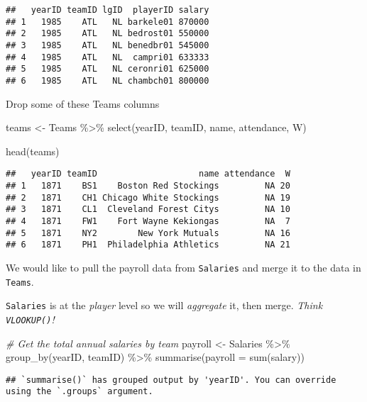 \documentclass[
]{article}
\newenvironment{Shaded}{\begin{snugshade}}{\end{snugshade}}
\newcommand{\AttributeTok}[1]{\textcolor[rgb]{0.77,0.63,0.00}{#1}}
\newcommand{\CommentTok}[1]{\textcolor[rgb]{0.56,0.35,0.01}{\textit{#1}}}
\newcommand{\FunctionTok}[1]{\textcolor[rgb]{0.00,0.00,0.00}{#1}}
\newcommand{\NormalTok}[1]{#1}
\newcommand{\OtherTok}[1]{\textcolor[rgb]{0.56,0.35,0.01}{#1}}
\newcommand{\SpecialCharTok}[1]{\textcolor[rgb]{0.00,0.00,0.00}{#1}}
\begin{document}
\begin{verbatim}
##   yearID teamID lgID  playerID salary
## 1   1985    ATL   NL barkele01 870000
## 2   1985    ATL   NL bedrost01 550000
## 3   1985    ATL   NL benedbr01 545000
## 4   1985    ATL   NL  campri01 633333
## 5   1985    ATL   NL ceronri01 625000
## 6   1985    ATL   NL chambch01 800000
\end{verbatim}

Drop some of these Teams columns

\begin{Shaded}
\begin{Highlighting}[]
\NormalTok{teams }\OtherTok{\textless{}{-}}\NormalTok{ Teams }\SpecialCharTok{\%\textgreater{}\%} 
  \FunctionTok{select}\NormalTok{(yearID, teamID, name, attendance, W)}

\FunctionTok{head}\NormalTok{(teams)}
\end{Highlighting}
\end{Shaded}

\begin{verbatim}
##   yearID teamID                    name attendance  W
## 1   1871    BS1    Boston Red Stockings         NA 20
## 2   1871    CH1 Chicago White Stockings         NA 19
## 3   1871    CL1  Cleveland Forest Citys         NA 10
## 4   1871    FW1    Fort Wayne Kekiongas         NA  7
## 5   1871    NY2        New York Mutuals         NA 16
## 6   1871    PH1  Philadelphia Athletics         NA 21
\end{verbatim}

We would like to pull the payroll data from \texttt{Salaries} and merge
it to the data in \texttt{Teams}.

\texttt{Salaries} is at the \emph{player} level so we will
\emph{aggregate} it, then merge. \emph{Think \texttt{VLOOKUP()}!}

\begin{Shaded}
\begin{Highlighting}[]
\CommentTok{\# Get the total annual salaries by team}
\NormalTok{payroll }\OtherTok{\textless{}{-}}\NormalTok{ Salaries }\SpecialCharTok{\%\textgreater{}\%} 
  \FunctionTok{group\_by}\NormalTok{(yearID, teamID) }\SpecialCharTok{\%\textgreater{}\%} 
  \FunctionTok{summarise}\NormalTok{(}\AttributeTok{payroll =} \FunctionTok{sum}\NormalTok{(salary))}
\end{Highlighting}
\end{Shaded}

\begin{verbatim}
## `summarise()` has grouped output by 'yearID'. You can override using the `.groups` argument.
\end{verbatim}
\end{document}
